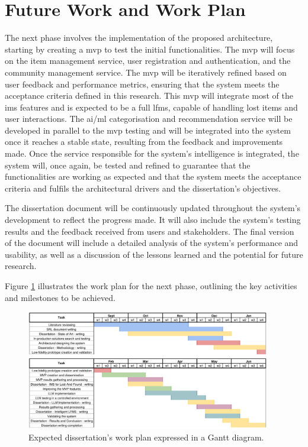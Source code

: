
\section{Future Work and Work Plan} \label{section:future_work_and_work_plan}

The next phase involves the implementation of the proposed architecture, starting by creating a \ac{mvp} to test the initial functionalities. The \ac{mvp} will focus on the item management service, user registration and authentication, and the community management service. The \ac{mvp} will be iteratively refined based on user feedback and performance metrics, ensuring that the system meets the acceptance criteria defined in this research. This \ac{mvp} will integrate most of the \ac{ims} features and is expected to be a full \ac{lfms}, capable of handling lost items and user interactions. The \ac{ai}/\ac{ml} categorisation and recommendation service will be developed in parallel to the \ac{mvp} testing and will be integrated into the system once it reaches a stable state, resulting from the feedback and improvements made. Once the service responsible for the system's intelligence is integrated, the system will, once again, be tested and refined to guarantee that the functionalities are working as expected and that the system meets the acceptance criteria and fulfils the architectural drivers and the dissertation's objectives.

The dissertation document will be continuously updated throughout the system's development to reflect the progress made. It will also include the system's testing results and the feedback received from users and stakeholders. The final version of the document will include a detailed analysis of the system's performance and usability, as well as a discussion of the lessons learned and the potential for future research.

Figure \ref{fig:gantt_diagram} illustrates the work plan for the next phase, outlining the key activities and milestones to be achieved.

\begin{figure}[!htb]
    \includegraphics[width=0.95\textwidth]{figs/chapter3/gantt_diagram.png}
    \centering
    \caption[Expected dissertation's work plan expressed in a Gantt diagram]{Expected dissertation's work plan expressed in a Gantt diagram.}
    \label{fig:gantt_diagram}
\end{figure}

